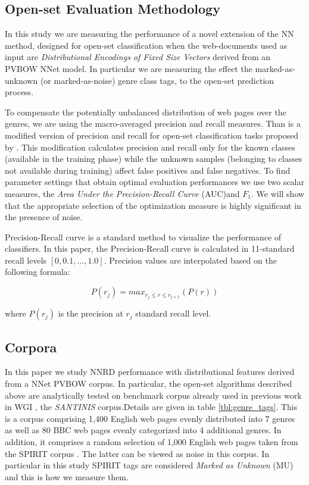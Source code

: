 \documentclass[runningheads]{llncs}
\begin{document}
\subsection{Open-set Evaluation Methodology}
In this study we are measuring the performance of a novel extension of the NN method, designed for open-set classification when the web-documents used as input are \textit{Distributional Encodings of Fixed Size Vectors} derived from an PVBOW NNet model. In particular we are measuring the effect the marked-as-unknown (or marked-as-noise) genre class tags, to the open-set prediction process.

To compensate the potentially unbalanced distribution of web pages over the genres, we are using the macro-averaged precision and recall measures. Than is a modified version of precision and recall for open-set classification tasks proposed by \cite{mendesjunior2016}. This modification calculates precision and recall only for the known classes (available in the training phase) while the unknown samples (belonging to classes not available during training) affect false positives and false negatives. To find parameter settings that obtain optimal evaluation performances we use two scalar measures, the \textit{Area Under the Precision-Recall Curve} (AUC)and $F_{1}$. We will show that the appropriate selection of the optimization measure is highly significant in the presence of noise.

Precision-Recall curve is a standard method to visualize the performance of classifiers. In this paper, the Precision-Recall curve is calculated in 11-standard recall levels $[0,0.1,...,1.0]$. Precision values are interpolated based on the following formula:

\begin{equation}
	P(r_j)=max_{r_j \leqslant r \leqslant r_{j+1}}(P(r))
\end{equation}

\noindent
where $P(r_j)$ is the precision at $r_j$ standard recall level.

\subsection{Corpora}\label{sec:corpora}
In this paper we study NNRD performance with distributional features derived from a NNet PVBOW corpus. In particular, the open-set algorithms described above are analytically tested on benchmark corpus already used in previous work in WGI \citep{meyer2004genre,santini2007automatic,kanaris2009learning,pritsos2018open}, the \textit{SANTINIS} \cite{mehler2010genres_on_web} corpus.Details are given in table \ref{tbl:genre_tags}. This is a corpus comprising 1,400 English web pages evenly distributed into 7 genres as well as 80 BBC web pages evenly categorized into 4 additional genres. In addition, it comprises a random selection of 1,000 English web pages taken from the SPIRIT corpus \cite{joho2004spirit}. The latter can be viewed as noise in this corpus. In particular in this study SPIRIT tags are considered \textit{Marked as Unknown} (MU) and this is how we measure them.
\end{document}
